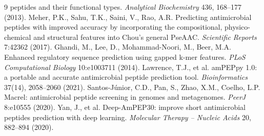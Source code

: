 \documentclass[12pt]{article}
\begin{document}
\begin{thebibliography}{9}
peptides and their functional types. \emph{Analytical Biochemistry} 436,
168--177 (2013).
 Meher, P.K., Sahu, T.K., Saini, V., Rao, A.R.
Predicting antimicrobial peptides with improved accuracy by incorporating
the compositional, physico-chemical and structural features into Chou's
general PseAAC. \emph{Scientific Reports} 7:42362 (2017).
 Ghandi, M., Lee, D., Mohammad-Noori, M., Beer, M.A.
Enhanced regulatory sequence prediction using gapped k-mer features.
\emph{PLoS Computational Biology} 10:e1003711 (2014).
 Lawrence, T.J., et al. amPEPpy 1.0: a portable and
accurate antimicrobial peptide prediction tool. \emph{Bioinformatics}
37(14), 2058--2060 (2021).
 Santos-J\'unior, C.D., Pan, S., Zhao, X.M., Coelho, L.P.
Macrel: antimicrobial peptide screening in genomes and metagenomes.
\emph{PeerJ} 8:e10555 (2020).
 Yan, J., et al. Deep-AmPEP30: improve short
antimicrobial peptides prediction with deep learning. \emph{Molecular
Therapy -- Nucleic Acids} 20, 882--894 (2020).
\end{thebibliography}
\end{document}
